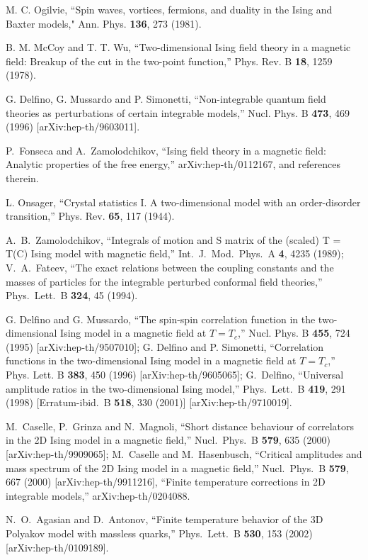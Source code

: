 \documentclass[a4paper,aps,prd,superscriptaddress,showpacs,showkeys]{revtex4}
\begin{document}
\begin{thebibliography}{99}
M. C. Ogilvie, 
``Spin waves, vortices, fermions, and duality in the Ising
and Baxter models,"
Ann. Phys. {\bf 136}, 273 (1981).

B. M. McCoy and T. T. Wu, ``Two-dimensional Ising field theory in a
magnetic field: Breakup of the cut in the two-point function,''
Phys. Rev. B {\bf 18}, 1259 (1978). 

G. Delfino, G. Mussardo and P. Simonetti, 
``Non-integrable quantum field
theories as perturbations of certain integrable models,''
Nucl. Phys. B {\bf 473},  469 (1996) 
[arXiv:hep-th/9603011].

P.~Fonseca and A.~Zamolodchikov,
``Ising field theory in a magnetic field: Analytic properties of the free
energy,''
arXiv:hep-th/0112167, and references therein.

L. Onsager,
``Crystal statistics I. A two-dimensional
model with an order-disorder transition,''
Phys. Rev. {\bf 65}, 117 (1944).

A.~B.~Zamolodchikov,
``Integrals of motion and S matrix of the (scaled) T = T(C) Ising model
with magnetic field,''
Int.\ J.\ Mod.\ Phys.\ A {\bf 4}, 4235 (1989);
V.~A.~Fateev,
``The exact relations between the coupling constants and the masses of
particles for the integrable perturbed conformal field theories,'' 
Phys.\ Lett.\ B {\bf 324}, 45 (1994).

G. Delfino and G. Mussardo, 
``The spin-spin correlation function in the
two-dimensional Ising model in a magnetic field at $T=T_c$,''
Nucl. Phys. B {\bf 455}, 724 (1995)
[arXiv:hep-th/9507010];
G. Delfino and P. Simonetti, 
``Correlation functions in the two-dimensional
Ising model in a magnetic field at $T=T_c$,''
Phys. Lett. B {\bf 383}, 450 (1996) 
[arXiv:hep-th/9605065];
G.~Delfino,
``Universal amplitude ratios in the two-dimensional Ising model,''
Phys.\ Lett.\ B {\bf 419}, 291 (1998)
[Erratum-ibid.\ B {\bf 518}, 330 (2001)]
[arXiv:hep-th/9710019].

M.~Caselle, P.~Grinza and N.~Magnoli,
``Short distance behaviour of correlators in the 2D Ising model in a
magnetic field,''
Nucl.\ Phys.\ B {\bf 579}, 635 (2000)
[arXiv:hep-th/9909065];
M.~Caselle and M.~Hasenbusch,
``Critical amplitudes and mass spectrum of the 2D Ising model in a
magnetic field,''
Nucl.\ Phys.\ B {\bf 579}, 667 (2000)
[arXiv:hep-th/9911216],
``Finite temperature corrections in 2D integrable models,''
arXiv:hep-th/0204088.

N.~O.~Agasian and D.~Antonov,
``Finite temperature behavior of the 3D Polyakov model with massless
quarks,'' 
Phys.\ Lett.\ B {\bf 530}, 153 (2002) 
[arXiv:hep-th/0109189].

\end{thebibliography}
\end{document}
